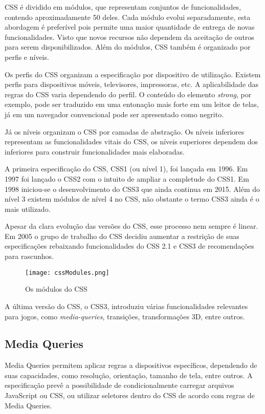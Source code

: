 CSS é dividido em módulos, que representam conjuntos de
funcionalidades, contendo aproximadamente 50 deles. Cada módulo evolui
separadamente, esta abordagem é preferível pois permite uma maior
quantidade de entrega de novas funcionalidades. Visto que novos recursos
não dependem da aceitação de outros para serem disponibilizados.
Além do módulos, CSS também é organizado por perfis e níveis.

Os perfis do CSS organizam a especificação por dispositivo de
utilização. Existem perfis para dispositivos móveis, televisores,
impressoras, etc. A aplicabilidade das regras do CSS varia dependendo do
perfil. O conteúdo do elemento \textit{strong}, por exemplo, pode ser
traduzido em uma entonação mais forte em um leitor de telas, já em um
navegador convencional pode ser apresentado como negrito.

Já os níveis organizam o CSS por camadas de abstração. Os níveis
inferiores representam as funcionalidades vitais do CSS, os níveis
superiores dependem dos inferiores para construir funcionalidades
mais elaboradas.

A primeira especificação do CSS, CSS1 (ou nível 1), foi lançada em
1996. Em 1997 foi lançado o CSS2 com o intuito de ampliar a completude
do CSS1. Em 1998 iniciou-se o desenvolvimento do CSS3 que ainda continua
em 2015. Além do nível 3 existem módulos de nível 4 no CSS, não
obstante o termo CSS3 ainda é o mais utilizado.

Apesar da clara evolução das versões do CSS, esse processo nem
sempre é linear. Em 2005 o grupo de trabalho do CSS decidiu aumentar a
restrição de suas especificações rebaixando funcionalidades do CSS
2.1 e CSS3 de recomendações para rascunhos.

\begin{figure}[H]
    \centering
    \texttt{[image: cssModules.png]}
    \caption{Os módulos do CSS}
\end{figure}

A última versão do CSS, o CSS3, introduziu várias funcionalidades
relevantes para jogos, como \textit{media-queries}, transições,
transformações 3D, entre outros.

\subsection{Media Queries}

Media Queries permitem aplicar regras a dispositivos específicos,
dependendo de suas capacidades, como resolução, orientação, tamanho
de tela, entre outros. A especificação prevê a possibilidade de
condicionalmente carregar arquivos JavaScript ou CSS, ou utilizar
seletores dentro do CSS de acordo com regras de Media Queries.

